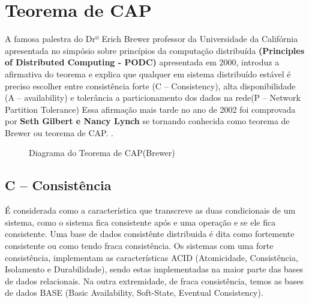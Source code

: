 \section{Teorema de CAP}
A famosa palestra do Drº Erich Brewer professor da Universidade da Califórnia apresentada no simpósio sobre princípios da computação distribuída \textbf{ (Principles of Distributed Computing - PODC) } 
apresentada em 2000, introduz a afirmativa do teorema e explica que qualquer em sistema distribuído estável é preciso escolher entre consistência forte (C – Consistency), alta disponibilidade (A – availability) e tolerância a particionamento dos dados na rede(P – Network Partition Tolerance)
Essa afirmação mais tarde no ano de 2002 foi comprovada por \textbf{ Seth Gilbert e Nancy Lynch } se tornando conhecida como teorema de Brewer ou teorema de CAP. \cite{BREWER}.

\begin{figure}[ht]
    \centering
    \caption{Diagrama do Teorema de CAP(Brewer)}
    \label{submeter}
\end{figure}


\subsection{ C – Consistência }
É considerada como a característica que transcreve as duas condicionais de um sistema, como o sistema fica consistente após e
uma operação e se ele fica consistente. Uma base de dados consistênte distribuida é dita como fortemente consistente ou 
como tendo fraca consistência. Os sistemas com uma forte consistência, implementam as características ACID 
(Atomicidade, Consistência, Isolamento e Durabilidade), sendo estas implementadas na maior parte das bases de dados relacionais. 
Na outra extremidade, de fraca consistência, temos as bases de dados BASE (Basic Availability, Soft-State, Eventual 
Consistency).

